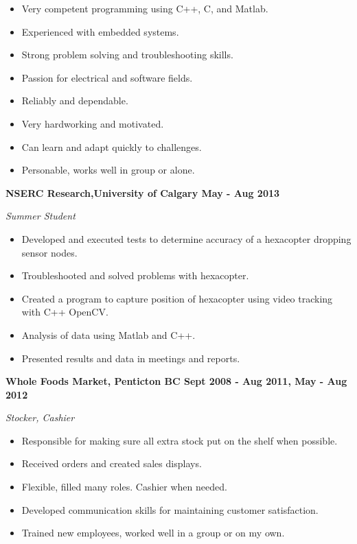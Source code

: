 \documentclass[12pt]{article} %
\begin{document}
\bigskip
{} 
\medskip
\begin{itemize}[noitemsep]
\item Very competent programming using C++, C, and Matlab. 
\item Experienced with embedded systems.
\item Strong problem solving and troubleshooting skills.
\item Passion for electrical and software fields.
\bigskip
\item Reliably and dependable. 
\item Very hardworking and motivated.
\item Can learn and adapt quickly to challenges.
\item Personable, works well in group or alone.
\end{itemize}
\noindent %


\bigskip
{} 
\medskip

\noindent \centerline{ \bf NSERC Research,University of Calgary \hfill May - Aug 2013}
\indent \emph{ Summer Student } 
\begin{itemize}[noitemsep]
  \item Developed and executed tests to determine accuracy of a hexacopter dropping sensor nodes.
  \item Troubleshooted and solved problems with hexacopter.
  \item Created a program to capture position of hexacopter using video tracking with C++ OpenCV.
  \item Analysis of data using Matlab and C++.
  \item Presented results and data in meetings and reports.
\end{itemize}

\noindent \centerline{ \bf Whole Foods Market, Penticton BC \hfill Sept 2008 - Aug 2011, May - Aug 2012}
\indent \emph{Stocker, Cashier}
\begin{itemize}[noitemsep]
  \item Responsible for making sure all extra stock put on the shelf when possible.
  \item Received orders and created sales displays.
  \item Flexible, filled many roles. Cashier when needed.
  \item Developed communication skills for maintaining customer satisfaction.
  \item Trained new employees, worked well in a group or on my own.
\end{itemize}
\end{document}

